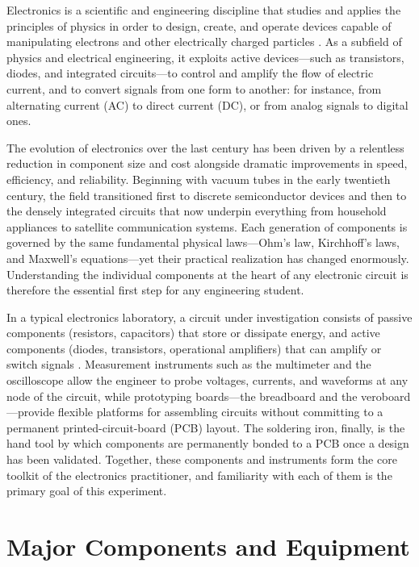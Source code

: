 \documentclass[12pt, a4paper, twoside]{report}
\begin{document}
Electronics is a scientific and engineering discipline that studies and applies the
principles of physics in order to design, create, and operate devices capable of
manipulating electrons and other electrically charged particles \cite{sedra2020}.
As a subfield of physics and electrical engineering, it exploits active devices---such as
transistors, diodes, and integrated circuits---to control and amplify the flow of electric
current, and to convert signals from one form to another: for instance, from alternating
current (AC) to direct current (DC), or from analog signals to digital ones.

The evolution of electronics over the last century has been driven by a relentless
reduction in component size and cost alongside dramatic improvements in speed, efficiency,
and reliability. Beginning with vacuum tubes in the early twentieth century, the field
transitioned first to discrete semiconductor devices and then to the densely integrated
circuits that now underpin everything from household appliances to satellite communication
systems. Each generation of components is governed by the same fundamental physical
laws---Ohm's law, Kirchhoff's laws, and Maxwell's equations---yet their practical
realization has changed enormously. Understanding the individual components at the heart
of any electronic circuit is therefore the essential first step for any engineering
student.

In a typical electronics laboratory, a circuit under investigation consists of passive
components (resistors, capacitors) that store or dissipate energy, and active components
(diodes, transistors, operational amplifiers) that can amplify or switch signals
\cite{boylestad2015}. Measurement instruments such as the multimeter and the oscilloscope
allow the engineer to probe voltages, currents, and waveforms at any node of the circuit,
while prototyping boards---the breadboard and the veroboard---provide flexible platforms
for assembling circuits without committing to a permanent printed-circuit-board (PCB)
layout. The soldering iron, finally, is the hand tool by which components are permanently
bonded to a PCB once a design has been validated. Together, these components and
instruments form the core toolkit of the electronics practitioner, and familiarity with
each of them is the primary goal of this experiment.

\section{Major Components and Equipment}
\end{document}
